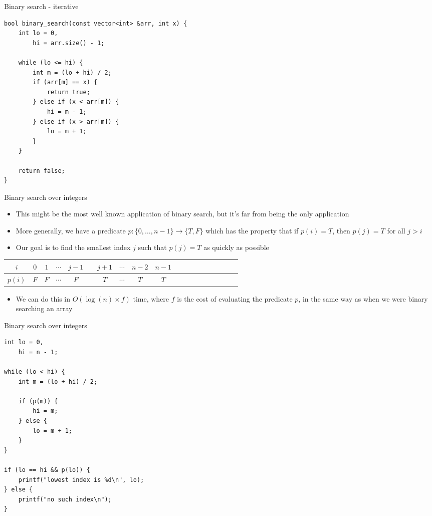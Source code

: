 \documentclass[12pt,t]{beamer}
\newcommand{\bi}{\begin{itemize}}
\newcommand{\ei}{\end{itemize}}
\begin{document}
\begin{frame}[fragile]{Binary search - iterative}
    \vspace{20pt}
    \begin{verbatim}
bool binary_search(const vector<int> &arr, int x) {
    int lo = 0,
        hi = arr.size() - 1;

    while (lo <= hi) {
        int m = (lo + hi) / 2;
        if (arr[m] == x) {
            return true;
        } else if (x < arr[m]) {
            hi = m - 1;
        } else if (x > arr[m]) {
            lo = m + 1;
        }
    }

    return false;
}
    \end{verbatim}
\end{frame}

\begin{frame}{Binary search over integers}
    \bi
        \item This might be the most well known application of binary search, but it's far from being the only application
        \item More generally, we have a predicate $p : \{0,\ldots,n-1\} \rightarrow \{T, F\}$ which has the property that if $p(i) = T$, then $p(j) = T$ for all $j > i$
        \item Our goal is to find the smallest index $j$ such that $p(j) = T$ as quickly as possible
    \ei

    \begin{center}
        \begin{tabular}{ccccccccccccccccccc}
            $i$ & $0$ & $1$ & $\cdots$ & $j-1$ & \color{vhilight}{$j$} & $j+1$ & $\cdots$ & $n-2$ & $n-1$ \\
            \hline
            $p(i)$ & $F$ & $F$ & $\cdots$ & $F$ & \color{vhilight}{$T$} & $T$ & $\cdots$ & $T$ & $T$ \\
        \end{tabular}
    \end{center}

    \bi
        \item We can do this in $O(\log(n) \times f)$ time, where $f$ is the cost of evaluating the predicate $p$, in the same way as when we were binary searching an array
    \ei
\end{frame}

\begin{frame}[fragile]{Binary search over integers}
    \begin{verbatim}
int lo = 0,
    hi = n - 1;

while (lo < hi) {
    int m = (lo + hi) / 2;

    if (p(m)) {
        hi = m;
    } else {
        lo = m + 1;
    }
}

if (lo == hi && p(lo)) {
    printf("lowest index is %d\n", lo);
} else {
    printf("no such index\n");
}
    \end{verbatim}
\end{frame}
\end{document}
